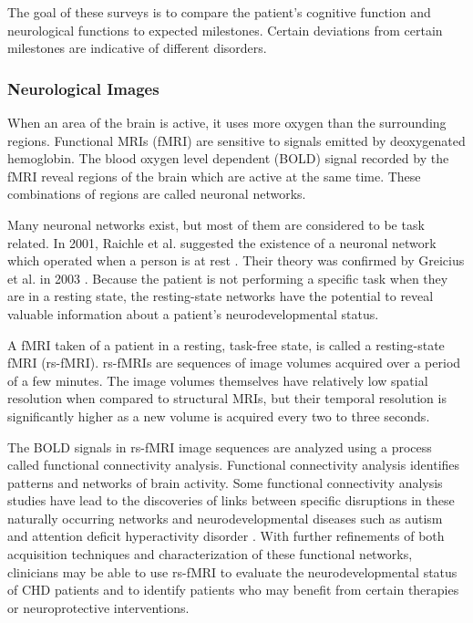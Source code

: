 The goal of these surveys is to compare the patient's cognitive function and neurological functions to expected milestones. Certain deviations from certain milestones are indicative of different disorders.

\subsubsection{Neurological Images}

When an area of the brain is active, it uses more oxygen than the surrounding regions. Functional MRIs (fMRI) are sensitive to signals emitted by deoxygenated hemoglobin. The blood oxygen level dependent (BOLD) signal recorded by the fMRI reveal regions of the brain which are active at the same time. These combinations of regions are called neuronal networks. 

Many neuronal networks exist, but most of them are considered to be task related. In 2001, Raichle et al. suggested the existence of a neuronal network which operated when a person is at rest \cite{Raichle2001}. Their theory was confirmed by Greicius et al. in 2003 \cite{Greicius2003}. Because the patient is not performing a specific task when they are in a resting state, the resting-state networks have the potential to reveal valuable information about a patient's neurodevelopmental status.

A fMRI taken of a patient in a resting, task-free state, is called a resting-state fMRI (rs-fMRI). rs-fMRIs are sequences of image volumes acquired over a period of a few minutes. The image volumes themselves have relatively low spatial resolution when compared to structural MRIs, but their temporal resolution is significantly higher as a new volume is acquired every two to three seconds. 

The BOLD signals in rs-fMRI image sequences are analyzed using a process called functional connectivity analysis. Functional connectivity analysis identifies patterns and networks of brain activity. Some functional connectivity analysis studies have lead to the discoveries of links between specific disruptions in these naturally occurring networks and neurodevelopmental diseases such as autism and attention deficit hyperactivity disorder \cite{Assaf2010} \cite{Zang2007}. With further refinements of both acquisition techniques and characterization of these functional networks, clinicians may be able to use rs-fMRI to evaluate the neurodevelopmental status of CHD patients and to identify patients who may benefit from certain therapies or neuroprotective interventions.

